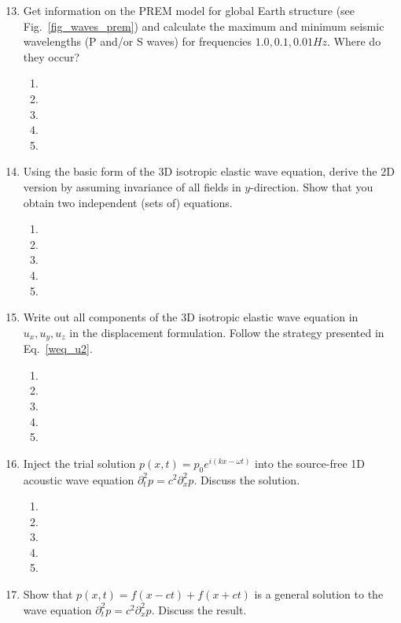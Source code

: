 \begin{enumerate}
\setcounter{enumi}{12}
\item
Get information on the PREM model for global Earth structure (see Fig.~\ref{fig_waves_prem}) and calculate the maximum and minimum seismic wavelengths (P and/or S waves) for frequencies $1.0, 0.1, 0.01 Hz$. Where do they occur? 
\begin{enumerate}
\item[]
\item[]
\item[] 
\item[]
\item[] 
\end{enumerate}
\item
Using the basic form of the 3D isotropic elastic wave equation, derive the 2D version by assuming invariance of all fields in $y$-direction. Show that you obtain two independent (sets of) equations. 
\begin{enumerate}
\item[]
\item[]
\item[] 
\item[]
\item[] 
\end{enumerate}
\item
Write out all components of the 3D isotropic elastic wave equation in $u_x, u_y, u_z$ in the displacement formulation. Follow the strategy presented in Eq.~\ref{weq_u2}.
\begin{enumerate}
\item[]
\item[]
\item[] 
\item[]
\item[] 
\end{enumerate}
\item
Inject the trial solution $p(x,t)=p_0 e^{i(kx-\omega t)}$ into the source-free 1D acoustic wave equation $\partial^2_t p = c^2 \partial_x^2 p$. Discuss the solution.
\begin{enumerate}
\item[]
\item[]
\item[] 
\item[]
\item[] 
\end{enumerate}
\item
Show that $p(x,t)=f(x-ct) + f(x+ct)$ is a general solution to the wave equation $\partial^2_t p = c^2 \partial_x^2 p$. Discuss the result. 

\end{enumerate}
